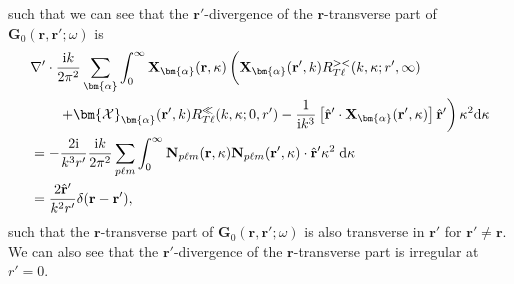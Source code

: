 such that we can see that the $\mathbf{r}'$-divergence of the $\mathbf{r}$-transverse part of $\mathbf{G}_0(\mathbf{r},\mathbf{r}';\omega)$ is 
\begin{equation}
\begin{split}
&\nabla'\cdot\frac{\mathrm{i}k}{2\pi^2}\sum_{\bm{\alpha}}\int_0^\infty\mathbf{X}_{\bm{\alpha}}(\mathbf{r},\kappa)\left( \vphantom{\frac{1}{4\pi k^2}} \mathbf{X}_{\bm{\alpha}}(\mathbf{r}',k)R_{T\ell}^{><}(k,\kappa;r',\infty)\right.\\
&\qquad\left.+ \bm{\mathcal{X}}_{\bm{\alpha}}(\mathbf{r}',k)R_{T\ell}^\ll(k,\kappa;0,r') - \frac{1}{\mathrm{i} k^3}\left[\hat{\mathbf{r}}'\cdot\mathbf{X}_{\bm{\alpha}}(\mathbf{r}',\kappa)\right]\hat{\mathbf{r}}'\right)\kappa^2\mathrm{d}\kappa\\
&= -\frac{2\mathrm{i}}{k^3r'}\frac{\mathrm{i}k}{2\pi^2}\sum_{p\ell m}\int_0^\infty\mathbf{N}_{p\ell m}(\mathbf{r},\kappa)\mathbf{N}_{p\ell m}(\mathbf{r}',\kappa)\cdot\hat{\mathbf{r}}'\kappa^2\;\mathrm{d}\kappa\\
&= \frac{2\hat{\mathbf{r}}'}{k^2r'}\delta(\mathbf{r} - \mathbf{r}'),
\end{split}
\end{equation}
such that the $\mathbf{r}$-transverse part of $\mathbf{G}_0(\mathbf{r},\mathbf{r}';\omega)$ is also transverse in $\mathbf{r}'$ for $\mathbf{r}'\neq\mathbf{r}$. We can also see that the $\mathbf{r}'$-divergence of the $\mathbf{r}$-transverse part is irregular at $r' = 0$. 

